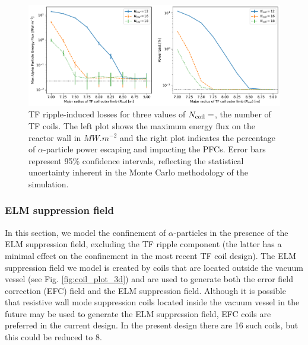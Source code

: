 \documentclass[10pt, a4paper, twoside]{article}
\begin{document}
\begin{figure}[!htb]
    \centering
    \includegraphics[width=0.99\linewidth]{Figures/max_and_total_flux_vs_rcoil_and_ncoil.pdf}
    \caption{TF ripple-induced losses for three values of $N_{\rm coil}=$, the number of TF coils. The left plot shows the maximum energy flux on the reactor wall in $\si{MW.m^{-2}}$ and the right plot indicates the percentage of $\alpha$-particle power escaping and impacting the PFCs. Error bars represent 95\% confidence intervals, reflecting the statistical uncertainty inherent in the Monte Carlo methodology of the simulation.}
    \label{fig:max_and_total_flux_vs_rcoil_and_ncoil}
\end{figure}

\subsubsection{ELM suppression field}
\label{sec:elm_suppression_field}

In this section, we model the confinement of $\alpha$-particles in the presence of the ELM suppression field, excluding the TF ripple component (the latter has a minimal effect on the confinement in the most recent TF coil design). The ELM suppression field we model is created by coils that are located outside the vacuum vessel (see Fig. \ref{fig:coil_plot_3d}) and are used to generate both the error field correction (EFC) field and the ELM suppression field. Although it is possible that resistive wall mode suppression coils located inside the vacuum vessel in the future may be used to generate the ELM suppression field, EFC coils are preferred in the current design. In the present design there are 16 such coils, but this could be reduced to 8.
\end{document}
